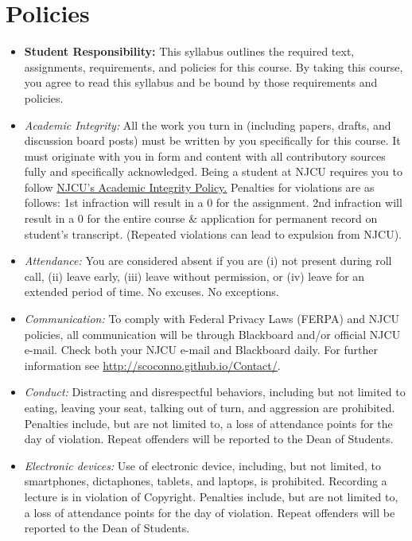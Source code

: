 \documentclass[article,oneside]{memoir}
\begin{document}
\section{Policies}

\begin{itemize}

\item \textbf{Student Responsibility:} This syllabus outlines the required text, assignments, requirements, and policies for this course. By taking this course, you agree to read this syllabus and be bound by those requirements and policies. 

 \item \textit{Academic Integrity:} All the work you turn in (including papers, drafts, and discussion board posts) must be written by you specifically for this course. It must originate with you in form and content with all contributory sources fully and specifically acknowledged. Being a student at NJCU requires you to follow \href{http://scoconno.github.io/Teaching/Plagiarism.pdf}{NJCU's Academic Integrity Policy.} Penalties for violations are as follows: 1st infraction will result in a 0 for the assignment.  2nd infraction will result in a 0 for the entire course \& application for permanent record on student's transcript. (Repeated violations can lead to expulsion from NJCU). 


\item \textit{Attendance:} You are considered absent if you are (i) not present during roll call, (ii) leave early, (iii) leave without permission, or (iv) leave for an extended period of time. No excuses. No exceptions.



\item \textit{Communication:} To comply with Federal Privacy Laws (FERPA) and NJCU policies, all communication will be through Blackboard and/or official NJCU e-mail. Check both your NJCU e-mail and Blackboard daily. For further information see \href{http://scoconno.github.io/Contact/}{http://scoconno.github.io/Contact/}.

\item \textit{Conduct:} Distracting and disrespectful behaviors, including but not limited to eating, leaving your seat, talking out of turn, and aggression are prohibited. Penalties include, but are not limited to, a loss of attendance points for the day of violation. Repeat offenders will be reported to the Dean of Students. 

\item \textit{Electronic devices:} Use of electronic device, including, but not limited, to smartphones, dictaphones, tablets, and laptops, is prohibited. Recording a lecture is in violation of Copyright. Penalties include, but are not limited to, a loss of attendance points for the day of violation. Repeat offenders will be reported to the Dean of Students.



\end{itemize}
\end{document}
